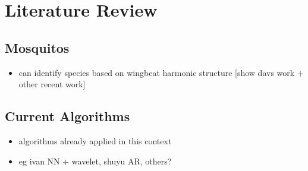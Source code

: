\section{Literature Review}
\label{sec:bg-litreview}

    \subsection{Mosquitos}
    \label{subsec:bg-litreview-mozz}
        \begin{itemize}
            \item{can identify species based on wingbeat harmonic structure [show davs work + other recent work]}
        \end{itemize}
    
    \subsection{Current Algorithms}
    \label{subsec:bg-litreview-currentalgs}
        \begin{itemize}
            \item{algorithms already applied in this context}
            \item{eg ivan NN + wavelet, shuyu AR, others?}
        \end{itemize}
    
